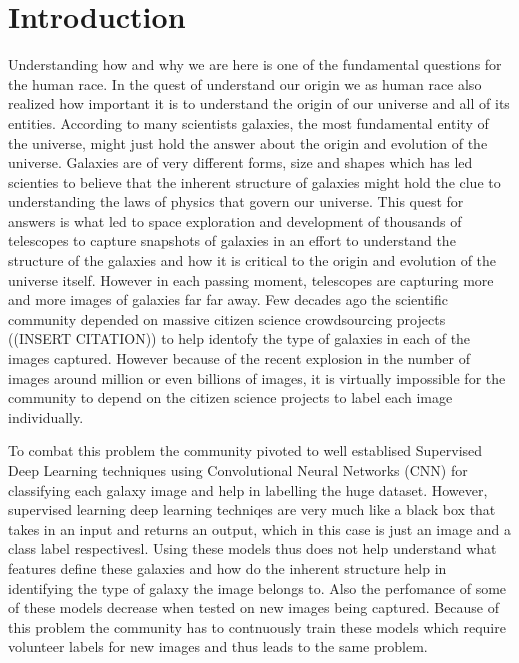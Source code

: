 \documentclass{article}
\begin{document}
\section{Introduction}
\label{introduction}
Understanding how and why we are here is one of the fundamental questions for the human race. In the quest of understand our origin we as human race also realized how important it is to understand the origin of our universe and all of its entities. According to many scientists galaxies, the most fundamental entity of the universe, might just hold the answer about the origin and evolution of the universe. Galaxies are of very different forms, size and shapes which has led scienties to believe that the inherent structure of galaxies might hold the clue to understanding the laws of physics that govern our universe. This quest for answers is what led to space exploration and development of thousands of telescopes to capture snapshots of galaxies in an effort to understand the structure of the galaxies and how it is critical to the origin and evolution of the universe itself. However in each passing moment, telescopes are capturing more and more images of galaxies far far away. Few decades ago the scientific community depended on massive citizen science crowdsourcing projects ((INSERT CITATION)) to help identofy the type of galaxies in each of the images captured. However because of the recent explosion in the number of images around million or even billions of images, it is virtually impossible for the community to depend on the citizen science projects to label each image individually. 

To combat this problem the community pivoted to well establised Supervised Deep Learning techniques using Convolutional Neural Networks (CNN) for classifying each galaxy image and help in labelling the huge dataset. However, supervised learning deep learning techniqes are very much like a black box that takes in an input and returns an output, which in this case is just an image and a class label respectivesl. Using these models thus does not help understand what features define these galaxies and how do the inherent structure help in identifying the type of galaxy the image belongs to.  Also the perfomance of some of these models   decrease when tested on new images being captured. Because of this problem the community has to contnuously train these models which require volunteer labels for new images and thus leads to the same problem. 
\end{document}
